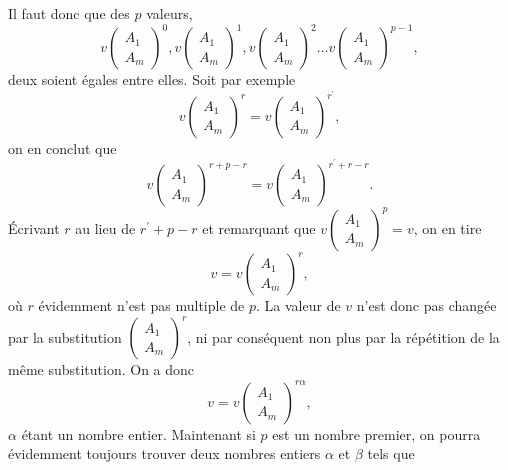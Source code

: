 \documentclass[oneside, 12 pt, leqno]{memoir}
\begin{document}
Il faut donc que des \(p\) valeurs,
\[v\left(\begin{array}{l}A_1 \\A_m\end{array}\right)^0, v\left(\begin{array}{l}A_1 \\A_m\end{array}\right)^1, v\left(\begin{array}{l}A_1 \\A_m\end{array}\right)^2 \dots v\left(\begin{array}{l}A_1 \\A_m\end{array}\right)^{p-1},\]
deux soient égales entre elles. Soit par exemple
\[v\left(\begin{array}{l}A_1 \\A_m\end{array}\right)^r=v\left(\begin{array}{l}A_1 \\A_m\end{array}\right)^{r^{\prime}},\]
on en conclut que
\[v\left(\begin{array}{l}A_1 \\A_m\end{array}\right)^{r+p-r}=v\left(\begin{array}{l}A_1 \\A_m\end{array}\right)^{r^{\prime}+r-r}.\]
Écrivant \(r\) au lieu de \(r^{\prime}+p-r\) et remarquant que \(v\left(\begin{array}{l}A_1 \\ A_m\end{array}\right)^p=v\), on en tire
\[v=v\left(\begin{array}{l}A_1 \\A_{m}\end{array}\right)^r,\]
où \(r\) évidemment n'est pas multiple de \(p\). La valeur de \(v\) n'est donc pas changée par la substitution \(\left(\begin{array}{l}A_1 \\ A_m\end{array}\right)^r\), ni par conséquent non plus par la répétition de la même substitution. On a donc
\[v=v\left(\begin{array}{l}A_1 \\A_m\end{array}\right)^{r \alpha},\]
\(\alpha\) étant un nombre entier. Maintenant si \(p\) est un nombre premier, on pourra évidemment toujours trouver deux nombres entiers \(\alpha\) et \(\beta\) tels que
\end{document}
